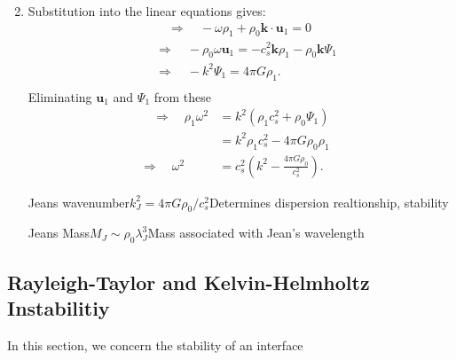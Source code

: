 \documentclass[12pt,a4paper]{article}
\begin{document}
\begin{enumerate}
$$    $$
    \item Substitution into the linear equations gives: 
    $$
    \begin{aligned}
    & \quad \Rightarrow \quad-\omega \rho_1+\rho_0 \mathbf{k} \cdot \mathbf{u}_1=0 \\
    & \Rightarrow \quad-\rho_0 \omega \mathbf{u}_1=-c_s^2 \mathbf{k} \rho_1-\rho_0 \mathbf{k} \Psi_1 \\
    & \Rightarrow \quad-k^2 \Psi_1=4 \pi G \rho_1 \text {. } \\
    &
    \end{aligned}
    $$
    Eliminating $\mathbf{u}_1$ and $\Psi_1$ from these
    $$
    \begin{aligned}
    \quad \Rightarrow \quad \rho_1 \omega^2 & =k^2\left(\rho_1 c_s^2+\rho_0 \Psi_1\right) \\
    & =k^2 \rho_1 c_s^2-4 \pi G \rho_0 \rho_1 \quad \\
    \Rightarrow \quad \omega^2 & =c_s^2\left(k^2-\frac{4 \pi G \rho_0}{c_s^2}\right) .
    \end{aligned}
    $$
\begin{definition}
    {Jeans wavenumber}{$k_J^2=4 \pi G \rho_0 / c_s^2$}{Determines dispersion realtionship, stability}
\end{definition}
\begin{definition}
    {Jeans Mass}{$M_J \sim \rho_0 \lambda_J^3$}{Mass associated with Jean's wavelength}
\end{definition}
\end{enumerate}


\subsection{Rayleigh-Taylor and Kelvin-Helmholtz Instabilitiy}
In this section, we concern the stability of an interface
\end{document}
